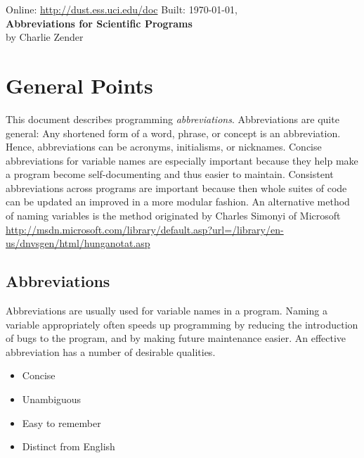 \documentclass[12pt,twoside]{article}
\begin{document}
\begin{center}
Online: \url{http://dust.ess.uci.edu/doc} \hfill Built: \shortdate\today, \xxivtime\\
\bigskip
{\Large \textbf{Abbreviations for Scientific Programs}}\\
\bigskip
by Charlie Zender\\
\end{center}

\setcounter{page}{1}
\pagestyle{headings}
\thispagestyle{empty}
\tableofcontents
{}
\setcounter{page}{1}
\thispagestyle{empty}

\section{General Points}

This document describes programming \textit{abbreviations}.
Abbreviations are quite general: Any shortened
form of a word, phrase, or concept is an abbreviation.
Hence, abbreviations can be acronyms, initialisms, or nicknames.
Concise abbreviations for variable names are especially important
because they help make a program become self-documenting and thus
easier to maintain.
Consistent abbreviations across programs are important because then
whole suites of code can be updated an improved in a more modular
fashion. 
An alternative method of naming variables is the  method originated by Charles Simonyi of Microsoft
\url{http://msdn.microsoft.com/library/default.asp?url=/library/en-us/dnvsgen/html/hunganotat.asp}

\subsection{Abbreviations}
Abbreviations are usually used for variable names in a program.
Naming a variable appropriately often speeds up programming by
reducing the introduction of bugs to the program, and by making future 
maintenance easier.
An effective abbreviation has a number of desirable qualities.
\begin{itemize}
\item Concise
\item Unambiguous
\item Easy to remember
\item Distinct from English
\end{itemize}
\end{document}
